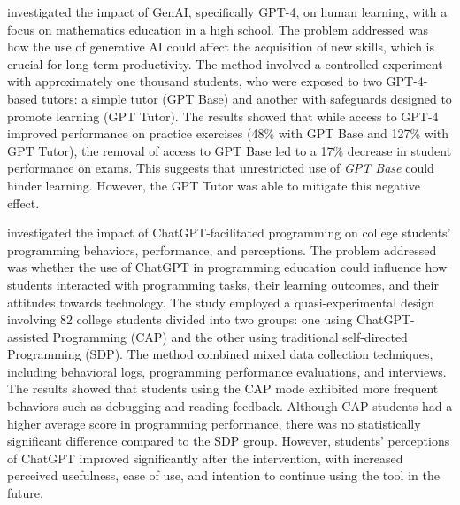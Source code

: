 \documentclass[a4paper,twoside]{article}
\begin{document}
\cite{Bastani24} investigated the impact of GenAI, specifically GPT-4, on human
learning, with a focus on mathematics education in a high school. The problem
addressed was how the use of generative AI could affect the acquisition of new
skills, which is crucial for long-term productivity. The method involved a
controlled experiment with approximately one thousand students, who were exposed
to two GPT-4-based tutors: a simple tutor (GPT Base) and another with safeguards
designed to promote learning (GPT Tutor). The results showed that while access
to GPT-4 improved performance on practice exercises (48\% with GPT Base and
127\% with GPT Tutor), the removal of access to GPT Base led to a 17\% decrease
in student performance on exams. This suggests that unrestricted use of
\textit{GPT Base} could hinder learning. However, the GPT Tutor was able to
mitigate this negative effect.

\cite{Boudouaia24} investigated the impact of ChatGPT-facilitated programming on
college students’ programming behaviors, performance, and perceptions. The
problem addressed was whether the use of ChatGPT in programming education could
influence how students interacted with programming tasks, their learning
outcomes, and their attitudes towards technology. The study employed a
quasi-experimental design involving 82 college students divided into two groups:
one using ChatGPT-assisted Programming (CAP) and the other using traditional
self-directed Programming (SDP). The method combined mixed data collection
techniques, including behavioral logs, programming performance evaluations, and
interviews. The results showed that students using the CAP mode exhibited more
frequent behaviors such as debugging and reading feedback. Although CAP students
had a higher average score in programming performance, there was no
statistically significant difference compared to the SDP group. However,
students’ perceptions of ChatGPT improved significantly after the intervention,
with increased perceived usefulness, ease of use, and intention to continue
using the tool in the future.
\end{document}
